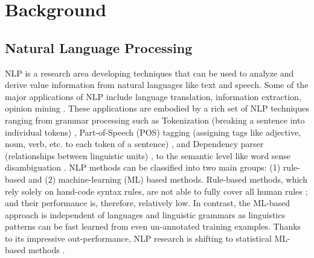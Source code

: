 \documentclass[Journal,InsideFigs, DoubleSpace]{ascelike} %
\begin{document}
% 
\section{Background} \label{sec:litrev} %
%
\subsection{Natural Language Processing}
NLP is a research area developing techniques that can be used to analyze and derive value information from natural languages like text and speech. Some of the major applications of NLP include language translation, information extraction, opinion mining \cite{Cambria14}. These applications are embodied by a rich set of NLP techniques ranging from grammar processing such as Tokenization (breaking a sentence into individual tokens) \cite{Webster92,Zhao11},  Part-of-Speech (POS) tagging (assigning tags like adjective, noun, verb, etc. to each token of a sentence) \cite{Toutanova03,Cunningham02}, and Dependency parser (relationships between linguistic units) \cite{chen14}, to the semantic level like word sense disambiguation \cite{Lesk86,Yarowsky95,Navigli09}. NLP methods can be classified into two main groups: (1) rule-based and (2) machine-learning (ML) based methods. Rule-based methods, which rely solely on hand-code syntax rules, are not able to fully cover all human rules \cite{Marcus95}; and their performance is, therefore, relatively low. In contrast, the ML-based approach is independent of languages and linguistic grammars \cite{costa-jussa12} as linguistics patterns can be fast learned from even un-annotated training examples. Thanks to its impressive out-performance, NLP research is shifting to statistical ML-based methods \cite{Cambria14}. 
%
\end{document}
